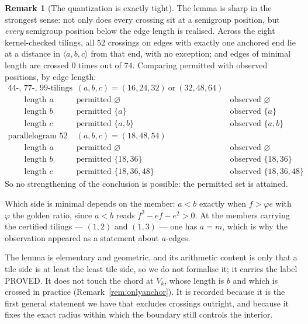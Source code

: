 \documentclass[11pt,reqno]{amsart}
\theoremstyle{plain}
\theoremstyle{definition}
\newtheorem{remark}[theorem]{Remark}
\begin{document}
\begin{remark}[The quantization is exactly tight]\label{lem:anchorclearsharp}
The lemma is sharp in the strongest sense: not only does every crossing sit at a semigroup position,
but \emph{every} semigroup position below the edge length is realised. Across the eight
kernel-checked tilings, all $52$ crossings on edges with exactly one anchored end lie at a distance
in $\langle a,b,c\rangle$ from that end, with no exception; and edges of minimal length are crossed
$0$ times out of $74$. Comparing permitted with observed positions, by edge length:
\[
\begin{array}{llll}
\text{$44$-, $77$-, $99$-tilings} & (a,b,c)=(16,24,32)\ \text{or}\ (32,48,64)\\
\qquad\text{length }a & \text{permitted } \varnothing & \text{observed } \varnothing\\
\qquad\text{length }b & \text{permitted }\{a\} & \text{observed }\{a\}\\
\qquad\text{length }c & \text{permitted }\{a,b\} & \text{observed }\{a,b\}\\[2pt]
\text{parallelogram }52 & (a,b,c)=(18,48,54)\\
\qquad\text{length }a & \text{permitted } \varnothing & \text{observed } \varnothing\\
\qquad\text{length }b & \text{permitted }\{18,36\} & \text{observed }\{18,36\}\\
\qquad\text{length }c & \text{permitted }\{18,36,48\} & \text{observed }\{18,36,48\}
\end{array}
\]
So no strengthening of the conclusion is possible: the permitted set is attained.

Which side is minimal depends on the member: $a<b$ exactly when $f>\varphi e$ with $\varphi$ the
golden ratio, since $a<b$ reads $f^2-ef-e^2>0$. At the members carrying the certified tilings ---
$(1,2)$ and $(1,3)$ --- one has $a=m$, which is why the observation appeared as a statement about
$a$-edges.

The lemma is elementary and geometric, and its arithmetic content is only that a tile side is at
least the least tile side, so we do not formalise it; it carries the label PROVED. It does not touch
the chord at $V_k$, whose length is $b$ and which is crossed in practice
(Remark~\ref{rem:onlyanchor}). It is recorded because it is the first general statement we have that
excludes crossings outright, and because it fixes the exact radius within which the boundary still
controls the interior.
\end{remark}
\end{document}
